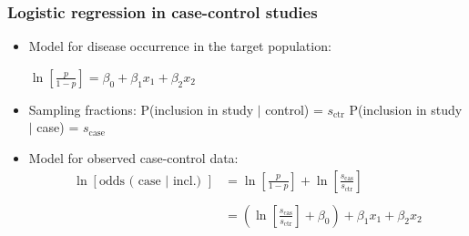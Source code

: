 \documentclass[handout,12pt,dvipsnames,t]{beamer}
\begin{document}
% 


\begin{frame}[fragile]
\frametitle{Logistic regression in case-control studies}

\begin{itemize}

\item Model for disease occurrence in the target population:
\begin{center}
$ \ln\left[\frac{p}{1-p}\right] = \beta_0 + \beta_1 x_1 + \beta_2 x_2 $
\end{center}

\item Sampling fractions:
  P(inclusion in study $\mid$ control)  =  $s_\text{ctr}$ 
  P(inclusion in study  $\mid$ case)  =  $s_\text{case}$ 

\item  Model for observed case-control data:
  \begin{align*}
 \ln[\mbox{odds ( case | incl.) }]
  & = \ln\left[\frac{p}{1-p}\right] +
      \ln\left[\frac{s_\text{cas}}{s_\text{ctr}}\right] \\ \\
  & =  \left( \ln\left[\frac{s_\text{cas}}{s_\text{ctr}}\right] + \beta_0 \right)
         + \beta_1 x_1 + \beta_2 x_2
  \end{align*}
\end{itemize}
\end{frame}
\end{document}
